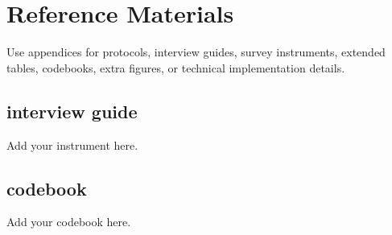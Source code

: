 \chapter{Reference Materials}

Use appendices for protocols, interview guides, survey instruments, extended tables, codebooks, extra figures, or technical implementation details.

\section{interview guide}
Add your instrument here.

\section{codebook}
Add your codebook here.
